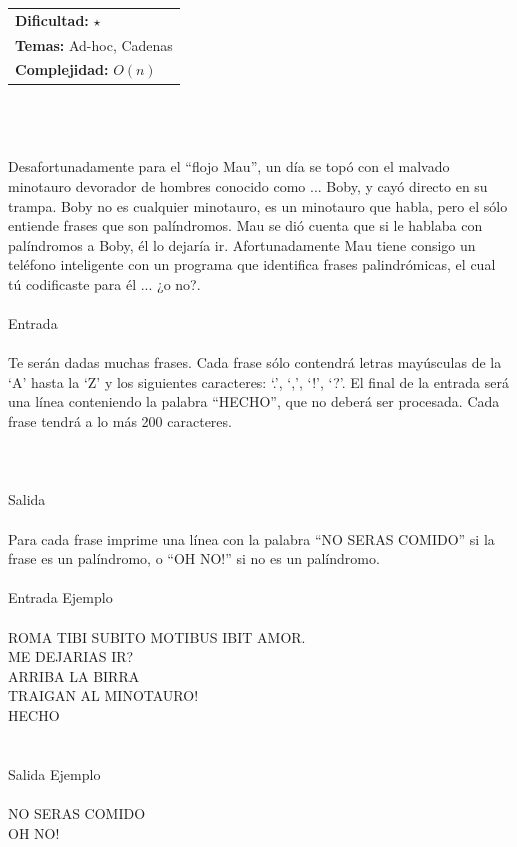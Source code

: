 \documentclass[12pt]{article}
\begin{document}
\hfill
\begin{tabular}{@{}l@{}}
\textbf{Dificultad:} $\star$ \\
\textbf{Temas:} Ad-hoc, Cadenas \\
\textbf{Complejidad:} $O(n)$
\end{tabular}\\
\\
\\
Desafortunadamente para el “flojo Mau”, un día se topó con el malvado minotauro devorador de hombres conocido como ... Boby, y cayó directo en su trampa. Boby no es cualquier minotauro, es un minotauro que habla, pero el sólo entiende frases que son palíndromos. Mau se dió cuenta que si le hablaba con palíndromos a Boby, él lo dejaría ir. Afortunadamente Mau tiene consigo un teléfono inteligente con un programa que identifica frases palindrómicas, el cual tú codificaste para él ... ¿o no?.\\
\\
\textrm{\large Entrada}
\\
\\Te serán dadas muchas frases. Cada frase sólo contendrá letras mayúsculas de la ‘A’ hasta la ‘Z’ y los siguientes
caracteres: ‘.’, ‘,’, ‘!’, ‘?’. El final de la entrada será una línea conteniendo la palabra “HECHO”, que no deberá ser procesada. Cada frase tendrá a lo más 200 caracteres.\\
\\
\\
\\
\textrm{\large Salida}
\\
\\Para cada frase imprime una línea con la palabra “NO SERAS COMIDO” si la frase es un palíndromo, o “OH NO!” si no es un palíndromo.
\\
\\
\textrm{\large Entrada Ejemplo}
\\
\\ROMA TIBI SUBITO MOTIBUS IBIT AMOR.\\
ME DEJARIAS IR?\\
ARRIBA LA BIRRA\\
TRAIGAN AL MINOTAURO!\\
HECHO\\
\\
\\
\textrm{\large Salida Ejemplo}
\\
\\NO SERAS COMIDO\\
OH NO!\\
\end{document}
